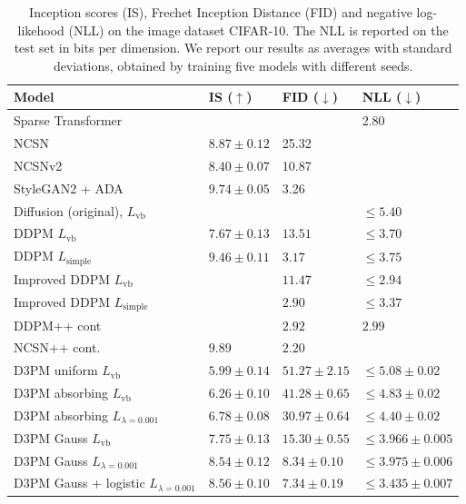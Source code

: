 \begin{table}[t]
  \caption{Inception scores (IS), Frechet Inception Distance (FID) and negative log-likehood (NLL) on the image dataset CIFAR-10.  The NLL is reported on the test set in bits per dimension. We report our results as averages with standard deviations, obtained by training five models with different seeds.}
  \label{tab:cifar10}
  \scriptsize
  \centering
  \begin{tabular}{llll}
    \toprule
    \multicolumn{1}{l}{Model}  & IS ($\uparrow$)    & FID ($\downarrow$) & NLL ($\downarrow$)        \\
    \midrule
    Sparse Transformer \citep{child2019generating}    &        &       & 2.80\\
    NCSN  \citep{song_2019}                 & $8.87\pm0.12$ & 25.32  &\\
    NCSNv2  \citep{song2020improved}        & $8.40\pm0.07$ & 10.87  &\\
    StyleGAN2 + ADA  \citep{karras2020training}      & $9.74\pm0.05$ & 3.26 &\\
    \midrule
    Diffusion (original), $L_{\mathrm{vb}}$ \citep{sohl2015deep}  & & & $\leq 5.40$ \\
    DDPM $L_{\mathrm{vb}}$ \citep{ho2020denoising}  & $7.67 \pm 0.13$  &  $13.51$ & $\leq 3.70$  \\
    DDPM $L_{\mathrm{simple}}$ \citep{ho2020denoising} & $9.46 \pm 0.11$  &  $3.17$ & $\leq 3.75$ \\
    Improved DDPM $L_{\mathrm{vb}}$ \citep{nichol2021improved} &   & $11.47$ & $\leq 2.94$ \\
    Improved DDPM $L_{\mathrm{simple}}$ \citep{nichol2021improved} &   & $2.90$ & $\leq 3.37$ \\
    DDPM++ cont \citep{song2020_sde} &   &  $2.92$ & $2.99$ \\
    NCSN++ cont. \citep{song2020_sde}  & $9.89$ & $2.20$ & \\
    \midrule
    D3PM uniform $L_{\mathrm{vb}}$ & $5.99 \pm 0.14$  &  $51.27 \pm 2.15$ & $\leq 5.08 \pm 0.02$  \\
    D3PM absorbing $L_{\mathrm{vb}}$ & $6.26 \pm 0.10$  &  $41.28 \pm 0.65$ & $\leq 4.83 \pm 0.02$  \\
    D3PM absorbing $L_{\lambda=0.001}$  & $6.78 \pm 0.08$  &  $30.97 \pm 0.64$ & $\leq 4.40 \pm 0.02$ \\
    D3PM Gauss $L_{\mathrm{vb}}$ & $7.75 \pm 0.13$  &  $15.30 \pm 0.55$ & $\leq 3.966 \pm 0.005$  \\
    D3PM Gauss  $L_{\lambda=0.001}$ & $8.54 \pm 0.12$  &  $8.34 \pm 0.10$ & $\leq 3.975 \pm 0.006$ \\
    D3PM Gauss + logistic $L_{\lambda=0.001}$ & $8.56 \pm 0.10$  &  $7.34 \pm 0.19$ &  $\leq 3.435 \pm 0.007$ \\
    \bottomrule
  \end{tabular}
\end{table}
